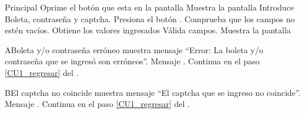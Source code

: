     \begin{UCtrayectoria}{Principal}
    \UCpaso[\UCactor] Oprime el botón  que esta en la pantalla 
    \UCpaso Muestra la pantalla 
	\UCpaso[\UCactor] Introduce Boleta, contraseña y captcha. \label{CU1_regresar} 
    \UCpaso[\UCactor] Presiona el botón .
    \UCpaso Comprueba que los campos no estén vacíos.  
    \UCpaso Obtiene los valores ingresados
    \UCpaso Válida campos. 
    \UCpaso Muestra la pantalla 
    \end{UCtrayectoria}
    
	\begin{UCtrayectoriaA}{A}{Boleta y/o contraseña erróneo}
		\UCpaso muestra mensaje “Error: La boleta y/o contraseña que se ingresó son erróneos”. Mensaje .
   		\UCpaso Continua en el paso \ref{CU1_regresar} del .
	\end{UCtrayectoriaA}
	
	\begin{UCtrayectoriaA}{B}{El captcha no coincide}
		\UCpaso muestra mensaje “El captcha que se ingreso no coincide”. Mensaje .
   		\UCpaso Continua en el paso \ref{CU1_regresar} del .
	\end{UCtrayectoriaA}
	


